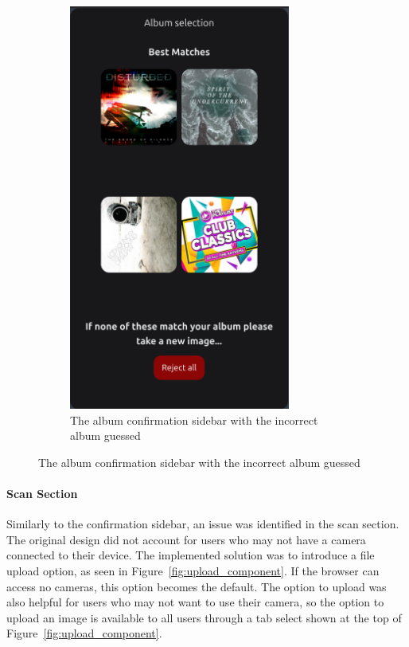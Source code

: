 \begin{figure}[H]
\begin{subfigure}[t]{0.3\textwidth}
        \includegraphics[width=0.8\textwidth]{figures/top_results_confirm.png}
        \caption{The album confirmation sidebar with the incorrect album guessed}
        \label{fig:album_confirmation_sidebar_incorrect}
    \end{subfigure}
\end{figure}

\paragraph{Scan Section}
Similarly to the confirmation sidebar, an issue was identified in the scan section. The original design did not account for users who may not have a camera connected to their device. The implemented solution was to introduce a file upload option, as seen in Figure~\ref{fig:upload_component}. If the browser can access no cameras, this option becomes the default. The option to upload was also helpful for users who may not want to use their camera, so the option to upload an image is available to all users through a tab select shown at the top of Figure~\ref{fig:upload_component}.

